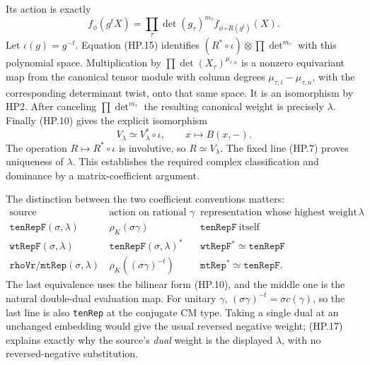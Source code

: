 Its action is exactly
\[
 f_\phi(g^tX)=\prod_\tau\det(g_\tau)^{m_\tau}
                                f_{\phi\circ R(g^t)}(X).
 \tag{HP.15}
\]
Let $\iota(g)=g^{-t}$.  Equation (HP.15) identifies
$(R^*\circ\iota)\otimes\prod\det^{m_\tau}$ with this polynomial
space.  Multiplication by
$\prod\det(X_\tau)^{\mu_{\tau,n}}$ is a nonzero equivariant map
from the canonical tensor module with column degrees
$\mu_{\tau,i}-\mu_{\tau,n}$, with the corresponding determinant
twist, onto that same space.  It is an isomorphism by HP2.
After canceling $\prod\det^{m_\tau}$ the resulting canonical weight
is precisely $\lambda$.  Finally (HP.10) gives the explicit
isomorphism
\[
      V_\lambda\simeq V_\lambda^*\circ\iota,
             \qquad x\longmapsto B(x,-).
 \tag{HP.16}
\]
The operation $R\mapsto R^*\circ\iota$ is involutive, so
$R\simeq V_\lambda$.  The fixed line (HP.7) proves uniqueness of
$\lambda$.  This establishes the required complex classification
and dominance by a matrix-coefficient argument.

The distinction between the two coefficient conventions matters:
\[
\begin{array}{c|c|c}
\text{source representation}&\text{action on rational }\gamma
       &\text{representation whose highest weight is }\lambda\\ \hline
\texttt{tenRepF}(\sigma,\lambda)&\rho_K(\sigma\gamma)
       &\texttt{tenRepF}\ \text{itself}\\
\texttt{wtRepF}(\sigma,\lambda)&\texttt{tenRepF}(\sigma,\lambda)^*
       &\texttt{wtRepF}^{*}\simeq\texttt{tenRepF}\\
\texttt{rhoVr}/\texttt{mtRep}(\sigma,\lambda)
       &\rho_K((\sigma\gamma)^{-t})
       &\texttt{mtRep}^{*}\simeq\texttt{tenRepF}.
\end{array}                                                   \tag{HP.17}
\]
The last equivalence uses the bilinear form (HP.10), and the middle
one is the natural double-dual evaluation map.  For unitary $\gamma$,
$(\sigma\gamma)^{-t}=\sigma c(\gamma)$, so the last line is also
\texttt{tenRep} at the conjugate CM type.  Taking a single dual at
an unchanged embedding would give the usual reversed negative
weight; (HP.17) explains exactly why the source's \emph{dual} weight
is the displayed $\lambda$, with no reversed-negative substitution.

